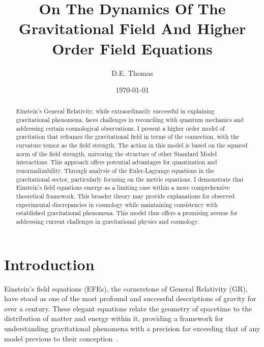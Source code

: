 \documentclass[aps,prd,preprint]{revtex4-1}
\begin{document}
\newcommand{\christoffel}[3]{
    \left\{ \begin{matrix} #1 \\ #2 #3 \end{matrix} \right\}
}

\title{On The Dynamics Of The Gravitational Field And Higher Order Field Equations}
\author{D.E. Thomas}
\date{\today}

\begin{abstract}
    Einstein's General Relativity, while extraordinarily successful in explaining gravitational phenomena, faces challenges in reconciling with quantum mechanics and addressing certain cosmological observations. I present a higher order model of gravitation that reframes the gravitational field in terms of the connection, with the curvature tensor as the field strength. The action in this model is based on the squared norm of the field strength, mirroring the structure of other Standard Model interactions. This approach offers potential advantages for quantization and renormalizability. Through analysis of the Euler-Lagrange equations in the gravitational sector, particularly focusing on the metric equations, I demonstrate that Einstein's field equations emerge as a limiting case within a more comprehensive theoretical framework. This broader theory may provide explanations for observed experimental discrepancies in cosmology while maintaining consistency with established gravitational phenomena. This model thus offers a promising avenue for addressing current challenges in gravitational physics and cosmology.
\end{abstract}

\maketitle

\section*{Introduction}

Einstein's field equations (EFEs), the cornerstone of General Relativity (GR), have stood as one of the most profound and successful descriptions of gravity for over a century. These elegant equations relate the geometry of spacetime to the distribution of matter and energy within it, providing a framework for understanding gravitational phenomena with a precision far exceeding that of any model previous to their conception~\cite{Einstein_1916,misner_2017}.
\end{document}

